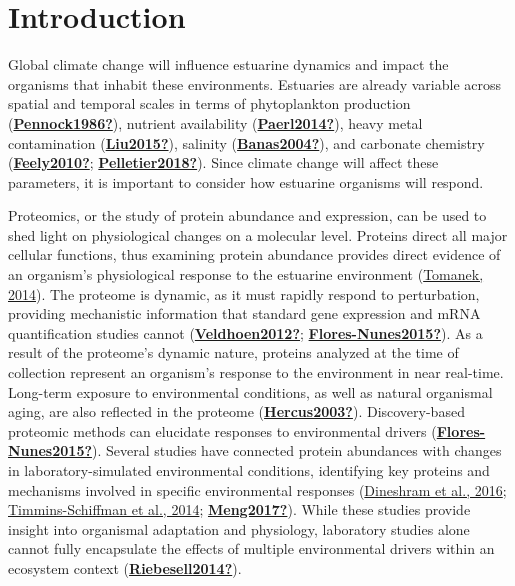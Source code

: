 \documentclass [11pt, proquest] {uwthesis}[2015/03/03]
\begin{document}
\hypertarget{introduction-1}{%
\section{Introduction}\label{introduction-1}}

Global climate change will influence estuarine dynamics and impact the organisms that inhabit these environments. Estuaries are already variable across spatial and temporal scales in terms of phytoplankton production (\protect\hyperlink{ref-Pennock1986}{\textbf{Pennock1986?}}), nutrient availability (\protect\hyperlink{ref-Paerl2014}{\textbf{Paerl2014?}}), heavy metal contamination (\protect\hyperlink{ref-Liu2015}{\textbf{Liu2015?}}), salinity (\protect\hyperlink{ref-Banas2004}{\textbf{Banas2004?}}), and carbonate chemistry (\protect\hyperlink{ref-Feely2010}{\textbf{Feely2010?}}; \protect\hyperlink{ref-Pelletier2018}{\textbf{Pelletier2018?}}). Since climate change will affect these parameters, it is important to consider how estuarine organisms will respond.

Proteomics, or the study of protein abundance and expression, can be used to shed light on physiological changes on a molecular level. Proteins direct all major cellular functions, thus examining protein abundance provides direct evidence of an organism's physiological response to the estuarine environment (\protect\hyperlink{ref-Tomanek2014}{Tomanek, 2014}). The proteome is dynamic, as it must rapidly respond to perturbation, providing mechanistic information that standard gene expression and mRNA quantification studies cannot (\protect\hyperlink{ref-Veldhoen2012}{\textbf{Veldhoen2012?}}; \protect\hyperlink{ref-Flores-Nunes2015}{\textbf{Flores-Nunes2015?}}). As a result of the proteome's dynamic nature, proteins analyzed at the time of collection represent an organism's response to the environment in near real-time. Long-term exposure to environmental conditions, as well as natural organismal aging, are also reflected in the proteome (\protect\hyperlink{ref-Hercus2003}{\textbf{Hercus2003?}}). Discovery-based proteomic methods can elucidate responses to environmental drivers (\protect\hyperlink{ref-Flores-Nunes2015}{\textbf{Flores-Nunes2015?}}). Several studies have connected protein abundances with changes in laboratory-simulated environmental conditions, identifying key proteins and mechanisms involved in specific environmental responses (\protect\hyperlink{ref-Dineshram2016}{Dineshram et al., 2016}; \protect\hyperlink{ref-Timmins-Schiffman2014}{Timmins-Schiffman et al., 2014}; \protect\hyperlink{ref-Meng2017}{\textbf{Meng2017?}}). While these studies provide insight into organismal adaptation and physiology, laboratory studies alone cannot fully encapsulate the effects of multiple environmental drivers within an ecosystem context (\protect\hyperlink{ref-Riebesell2014}{\textbf{Riebesell2014?}}).
\end{document}
